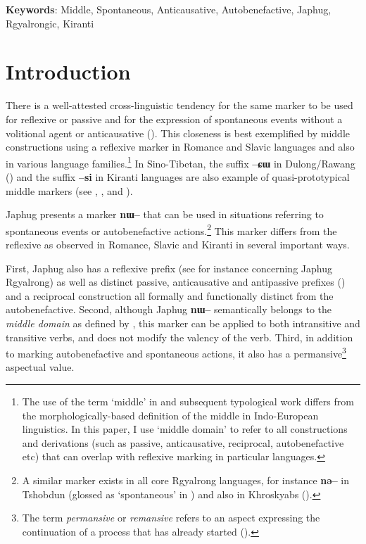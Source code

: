 \documentclass[oldfontcommands,oneside,a4paper,11pt]{article}
\newcommand{\ipa}[1]{\textbf{{\phon\mbox{#1}}}} %
\begin{document}
\textbf{Keywords}: Middle, Spontaneous, Anticausative, Autobenefactive, Japhug, Rgyalrongic, Kiranti


\section{Introduction}
There is a well-attested cross-linguistic tendency for the same marker to be used for reflexive or passive and for the expression of spontaneous events without a volitional agent or anticausative (\citealt[142-144]{kemmer93middle}). This closeness is best exemplified by middle constructions using a reflexive marker  in Romance and Slavic languages and also in various language families.\footnote{The use of the term `middle' in \citet{kemmer93middle}  and subsequent typological work differs from the morphologically-based definition of the middle in Indo-European linguistics.    In this paper, I use `middle domain' to refer to all constructions and derivations (such as passive, anticausative, reciprocal, autobenefactive etc) that can overlap with reflexive marking in particular languages. } In Sino-Tibetan, the suffix \ipa{--ɕɯ}  in Dulong/Rawang (\citealt{lapolla05reflexive}) and the suffix \ipa{--si}  in Kiranti languages are also example of quasi-prototypical middle markers (see \citealt[144-146]{michailovsky88}, \citealt[125-129]{driem93dumi}, \citealt[260-263]{opgenort04wambule} and \citealt[398]{bickel10ditransitive}).

Japhug presents a marker \ipa{nɯ--} that can be used in situations referring to  spontaneous events or autobenefactive actions.\footnote{A similar marker exists in all core Rgyalrong languages, for instance \ipa{nə--} in Tshobdun (glossed as `spontaneous' in \citealt[634]{jackson14morpho}) and also in Khroskyabs (\citealt[157-160]{lai13affixale}).} This marker differs from the reflexive as observed in Romance, Slavic and Kiranti in several important ways.

First, Japhug also has a  reflexive prefix (see for instance \citealt{jacques10refl} concerning Japhug Rgyalrong) as well as distinct passive, anticausative and antipassive prefixes (\citealt{jacques12demotion}) and a reciprocal construction all formally and functionally distinct from the autobenefactive. Second, although Japhug  \ipa{nɯ--}  semantically belongs to the \textit{middle domain} as defined by \citet[15]{kemmer93middle}, this marker can be applied to both intransitive and transitive verbs,  and does not modify the valency of the verb.  Third, in addition to marking autobenefactive and spontaneous actions, it also has a permansive\footnote{The term \textit{permansive} or \textit{remansive} refers to an aspect expressing the continuation of a process that has already started (\citealt[130]{francois03predicat}).} aspectual value.
 
\end{document}
